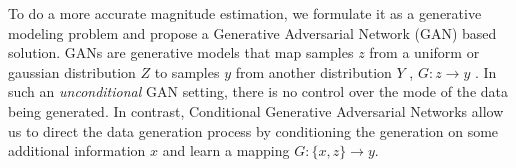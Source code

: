 \documentclass[a4paper]{article}
\begin{document}
To do a more accurate magnitude estimation, we formulate it as a generative modeling problem and propose a Generative Adversarial Network (GAN)\cite{goodfellow2014generative} based solution.
GANs are generative models that map samples $z$ from a uniform or gaussian distribution $Z$ to samples $y$ from another distribution $Y$ , $G: z\rightarrow y$ \cite{goodfellow2014generative}. In such an \textit{unconditional} GAN setting, there is no control over the mode of the data being generated. In contrast, Conditional Generative Adversarial Networks \cite{cGAN} allow us to direct the data generation process by conditioning the generation on some additional information $x$ and learn a mapping $G: \{x,z\}\rightarrow y$.
\end{document}
